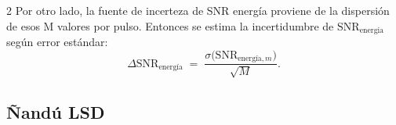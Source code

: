 \documentclass[11pt,letterpaper]{article}
\begin{document}
\begin{multicols*}{2}
Por otro lado, la fuente de incerteza de SNR energía proviene de la dispersión de esos 
M valores por pulso. Entonces se estima la incertidumbre de \(\mathrm{SNR}_{\mathrm{energia}}\) según error estándar:
\[
\Delta\mathrm{SNR}_{\text{energía}} \;=\; \frac{\sigma \bigl(\mathrm{SNR}_{\text{energía},m}\bigr)}{\sqrt{M}}.
\]



    
        
        
    

\subsection*{Ñandú LSD}
\label{apendice: ñandu lsd}


\end{multicols*}
\end{document}
